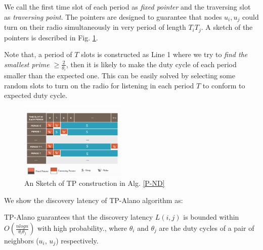 We call the first time slot of each period as \emph{fixed pointer} and the traversing
slot as \emph{traversing point}. The pointers are designed to guarantee that nodes $u_i, u_j$
could turn on their radio simultaneously in very period of length $T_i T_j$. A sketch of the pointers is described in Fig. \ref{TP}.

Note that, a period of $T$ slots is constructed as Line 1 where we try to \emph{find the smallest prime $\geq \frac{2}{\theta_i}$},
then it is likely to make the duty cycle of each period smaller than the expected one. This can be easily solved by selecting some random slots to turn on the radio for listening in each period $T$ to conform to expected duty cycle.


\begin{figure}[!h]
\centering
\includegraphics[width=2in]{./Figure/TP}
\caption{An Sketch of TP construction in Alg. \ref{P-ND}}
\label{TP}
\end{figure}

We show the discovery latency of TP-Alano algorithm as:


\begin{theorem}
\label{PBND1}
TP-Alano guarantees that the discovery latency $L(i,j)$
is bounded within $O(\frac{nlogn}{\theta_i\theta_j})$ with high probability.,
where $\theta_i$ and $\theta_j$ are the duty cycles of
a pair of neighbors ($u_i$, $u_j$) respectively.
\end{theorem}



